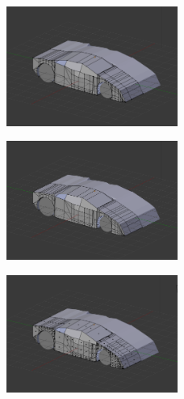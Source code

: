 \documentclass[10pt]{article}
\begin{document}
\begin{figure}[H]
	\begin{center}
 		\includegraphics[width = 0.5\textwidth]{Imagenes/modelSolidVertex.eps}
	\end{center} 
\end{figure}

\begin{figure}[H]
	\begin{center}
 		\includegraphics[width = 0.5\textwidth]{Imagenes/modelSolidEdges.eps}
	\end{center} 
\end{figure}

\begin{figure}[H]
	\begin{center}
 		\includegraphics[width = 0.5\textwidth]{Imagenes/modelSolidFaces.eps}
	\end{center} 
\end{figure}
\end{document}
